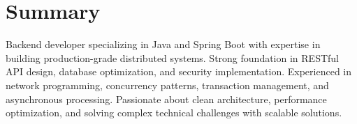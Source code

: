 \section{Summary}
\noindent Backend developer specializing in Java and Spring Boot with expertise in building production-grade distributed systems. Strong foundation in RESTful API design, database optimization, and security implementation. Experienced in network programming, concurrency patterns, transaction management, and asynchronous processing. Passionate about clean architecture, performance optimization, and solving complex technical challenges with scalable solutions.

